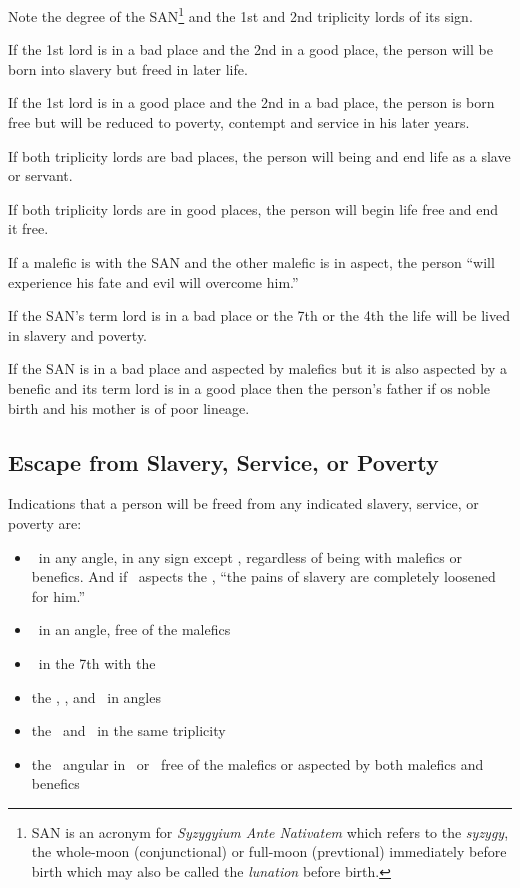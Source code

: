 Note the degree of the SAN\footnote{SAN is an acronym for \textsl{Syzygyium Ante Nativatem} which refers to the \textsl{syzygy}, the whole-moon (conjunctional) or full-moon (prevtional) immediately before birth which may also be called the \textsl{lunation} before birth.} and the 1st and 2nd triplicity lords of its sign. 

If the 1st lord is in a bad place and the 2nd in a good place, the person will be born into slavery but freed in later life.

If the 1st lord is in a good place and the 2nd in a bad place, the person is born free but will be reduced to poverty, contempt and service in his later years.

If both triplicity lords are bad places, the person will being and end life as a slave or servant.

If both triplicity lords are in good places, the person will begin life free and end it free.

If a malefic is with the SAN and the other malefic is in aspect, the person ``will experience his fate and evil will overcome him.''

If the SAN's term lord is in a bad place or the 7th or the 4th the life will be lived in slavery and poverty.

If the SAN is in a bad place and aspected by malefics but it is also aspected by a benefic and its term lord is in a good place then the person's father if os noble birth and his mother is of poor lineage.

\subsection{Escape from Slavery, Service, or Poverty}
Indications that a person will be freed from any indicated slavery, service, or poverty are:
\begin{itemize}[topsep=0em, itemsep=0em]
\item \Jupiter\,  in any angle, in any sign except \Capricorn, regardless of being with malefics or benefics. And if \Jupiter\, aspects the \Moon, ``the pains of slavery are completely loosened for him.''

\item \Venus\, in an angle, free of the malefics

\item \Venus\,  in the 7th with the \Moon

\item the \Sun, \Moon, and \Mercury\, in angles
\item the \Sun\, and \Moon\, in the same triplicity
\item the \Moon\, angular in \Taurus\, or \Cancer\, free of the malefics or aspected by both malefics and benefics
\end{itemize}

